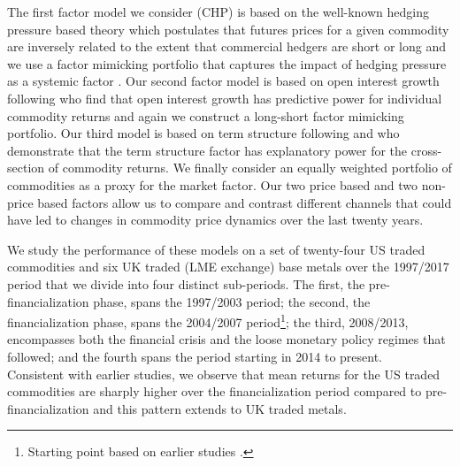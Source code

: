 \documentclass[12pt,]{article}
\let\rmarkdownfootnote\footnote%
\def\footnote{\protect\rmarkdownfootnote}
\begin{document}
The first factor model we consider (CHP) is based on the well-known
hedging pressure based theory
\citep{anderson_hedger_1983, chang_returns_1985, cootner_returns_1960, dusak_futures_1973, hicks_value_1939, hirshleifer_risk_1988, hirshleifer_determinants_1989, hirshleifer_hedging_1990, kolb_is_1992, keynes_treatise_1930}
which postulates that futures prices for a given commodity are inversely
related to the extent that commercial hedgers are short or long and we
use a factor mimicking portfolio that captures the impact of hedging
pressure as a systemic factor \citep{basu_capturing_2013}. Our second
factor model is based on open interest growth following
\citet{hong_what_2012} who find that open interest growth has predictive
power for individual commodity returns and again we construct a
long-short factor mimicking portfolio. Our third model is based on term
structure following \citet{szymanowska_anatomy_2014} and
\citet{fuertes_commodity_2015} who demonstrate that the term structure
factor has explanatory power for the cross-section of commodity returns.
We finally consider an equally weighted portfolio of commodities as a
proxy for the market factor. Our two price based and two non-price based
factors allow us to compare and contrast different channels that could
have led to changes in commodity price dynamics over the last twenty
years.

We study the performance of these models on a set of twenty-four US
traded commodities and six UK traded (LME exchange) base metals over the
1997/2017 period that we divide into four distinct sub-periods. The
first, the pre-financialization phase, spans the 1997/2003 period; the
second, the financialization phase, spans the 2004/2007 period\footnote{Starting
  point based on earlier studies
  \citep{baker_financialization_2014, christoffersen_factor_2014}.}; the
third, 2008/2013, encompasses both the financial crisis and the loose
monetary policy regimes that followed; and the fourth spans the period
starting in 2014 to present.\\
Consistent with earlier studies, we observe that mean returns for the US
traded commodities are sharply higher over the financialization period
compared to pre-financialization and this pattern extends to UK traded
metals.
\end{document}
